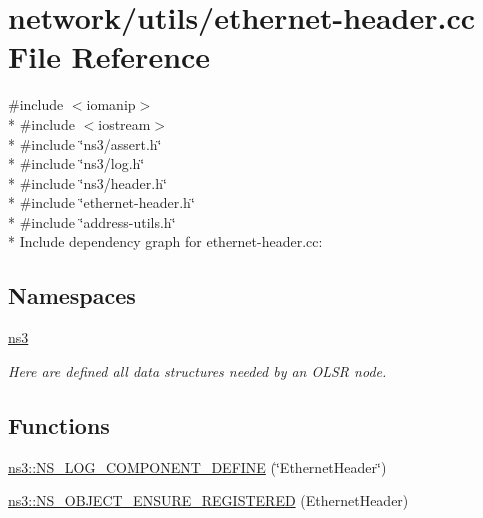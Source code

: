 \hypertarget{ethernet-header_8cc}{}\section{network/utils/ethernet-\/header.cc File Reference}
\label{ethernet-header_8cc}
{\ttfamily \#include $<$iomanip$>$}\\*
{\ttfamily \#include $<$iostream$>$}\\*
{\ttfamily \#include \char`\"{}ns3/assert.\+h\char`\"{}}\\*
{\ttfamily \#include \char`\"{}ns3/log.\+h\char`\"{}}\\*
{\ttfamily \#include \char`\"{}ns3/header.\+h\char`\"{}}\\*
{\ttfamily \#include \char`\"{}ethernet-\/header.\+h\char`\"{}}\\*
{\ttfamily \#include \char`\"{}address-\/utils.\+h\char`\"{}}\\*
Include dependency graph for ethernet-\/header.cc\+:
\subsection*{Namespaces}
\begin{DoxyCompactItemize}
\item 
 \hyperlink{namespacens3}{ns3}
\begin{DoxyCompactList}\small\item\em Here are defined all data structures needed by an O\+L\+SR node. \end{DoxyCompactList}\end{DoxyCompactItemize}
\subsection*{Functions}
\begin{DoxyCompactItemize}
\item 
\hyperlink{namespacens3_a8947605a7e0afb431b24e5b1a56e8c4f}{ns3\+::\+N\+S\+\_\+\+L\+O\+G\+\_\+\+C\+O\+M\+P\+O\+N\+E\+N\+T\+\_\+\+D\+E\+F\+I\+NE} (\char`\"{}Ethernet\+Header\char`\"{})
\item 
\hyperlink{namespacens3_a27b53731e73cc6f26daaad54891f8d9a}{ns3\+::\+N\+S\+\_\+\+O\+B\+J\+E\+C\+T\+\_\+\+E\+N\+S\+U\+R\+E\+\_\+\+R\+E\+G\+I\+S\+T\+E\+R\+ED} (Ethernet\+Header)
\end{DoxyCompactItemize}
